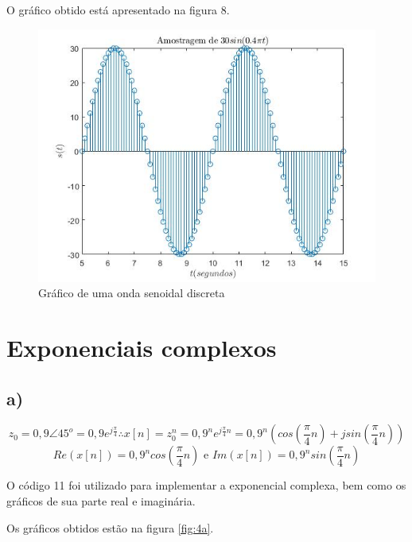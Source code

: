 \documentclass[a4paper, 12pt]{article}
\begin{document}
O gráfico obtido está apresentado na figura 8.
\begin{figure}[H]
	\centering
	\includegraphics[scale=0.7]{../Imagens/ex3/b.jpg}  
	\caption{Gráfico de uma onda senoidal discreta}
	\label{fig:3b}
\end{figure}

\section{Exponenciais complexos}

\subsection{a)}

$$z_0=0,9\angle45^{o}=0,9e^{j\frac{\pi}{4}} \therefore x[n]=z_0^n=0,9^ne^{j\frac{\pi}{4}n}=0,9^n(cos(\frac{\pi}{4}n) + jsin(\frac{\pi}{4}n))$$
$$Re(x[n]) = 0,9^ncos(\frac{\pi}{4}n) \text{ e } Im(x[n]) = 0,9^nsin(\frac{\pi}{4}n)$$

O código 11 foi utilizado para implementar a exponencial complexa, bem como os gráficos de sua parte real e imaginária.



Os gráficos obtidos estão na figura \ref{fig:4a}.
\end{document}
